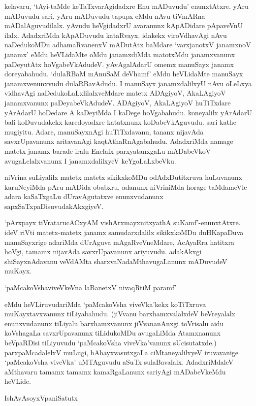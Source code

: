 kelavaru, `tAyi-taMde keTaTxvarAgidadxre Enu mADuvudu' enunxtAtxre. yAru mADuvudu sari, yAru mADuvudu tapupx eMdu nAvu tiVmARna mADalAguvudilalx. yAvudu heVgidadxrU avaranunx kApADidare pApaveVnU ilalx. AdadxriMda kApADuvudu kataRvayx. idakekx viroVdhavAgi nAvu naDedukoMDu adhamaRvanenxV mADutAtx baMdare `varxjanotxV janamxnoV janamx' eMdu heVLidaMte oMdu janamxdiMda matotxMdu janamxvanunx paDeyutAtx hoVgabeVkAdudeV. yAvAgalAdarU omemx manuSayx janamx doreyabahudu. `dulaRBaM mAnuSaM deVhamf' eMdu heVLidaMte manuSayx janamxvenunxvudu dulaRBavAdudu. I manuSayx janamxdalilxyU nAvu oLeLxya vidhavAgi naDedukoLaLxlilalxveMdare matetx ADAgiyoV, AkaLAgiyoV janamxvanunx paDeyabeVkAdudeV. ADAgiyoV, AkaLAgiyoV huTiTxdare yArAdarU hoDedare A kaDeyiMda I kaDege hoVgabahudu. koneyalilx yArAdarU bali koDuvudakekx karedoyadxre katatxnunx koDabeVkAguvudu. sari kathe mugiyitu. Adare, manuSayxnAgi huTiTxdavanu, tananx nijavAda savxrUpavanunx aritavanAgi kaqtAthaRnAgabahudu. AdadxriMda namage matetx janamx barade iralu Enelalx parxyatanxgaLu mADabeVkoV avugaLelalxvanunx I janamxdalilxyeV keYgoLaLxbeVku.

niVrina suLiyalilx matetx matetx sikikxkoMDu odAdxDutitxruva huLuvanunx karuNeyiMda pAru mADida obabxru, adanunx niVriniMda horage taMdameVle adara kaSaTxgaLu dUravAgutatxve enunxvudanunx sapxSaTxpaDisuvudakAkxgiyeV.

`pArxpayx tiVratarucACxyAM vishArxmayxnitxyathA suKamf'-enunxtAtxre. ideV riVti matetx-matetx janamx samudarxdalilx sikikxkoMDu duHKapaDuva manuSayxrige adariMda dUrAguva mAgaRveVneMdare, AcAyaRra hatitxra hoVgi, tamamx nijavAda savxrUpavanunx ariyuvudu. adakAkxgi shiSayxnAdavanu veVdAMta sharxvaNadaMthavugaLanunx mADuvudeV muKayx.

\begin{shloka}
`paMcakoVshaviveVkeVna laBanetxV nivaqRtiM paramf'
\end{shloka}

eMdu heVLiruvudariMda `paMcakoVsha viveVka'kekx koTiTxruva muKayxtavxvanunx tiLiyabahudu. (jiVvanu barxhamxvalalxdeV beVreyalalx enunxvudanunx tiLiyalu barxhamxvanunx jiVvananAnxgi toVrisalu aidu koVshagaLa savxrUpavanunx tiLidukoMDu avugaLiMda Atamxnanunx beVpaRDisi tiLiyuvudu `paMcakoVsha viveVka'vanunx sUcisutatxde.) parxpaMcadalelxV muLugi, bAhayxvasutxgaLa ciMtaneyalilxyeV iruvavanige `paMcakoVsha viveVka' uMTAguvudu aSuTx sulaBavalalx. AdadxriMdaleV aMthavaru tamamx tamamx kamaRgaLanunx sariyAgi mADabeVkeMdu heVLide.

IshAvAsoyxVpaniSatutx

